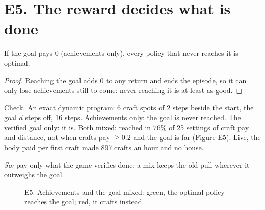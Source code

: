 \section*{E5. The reward decides what is done}
\begin{proposition} If the goal pays $0$ (achievements only), every policy that never reaches it is optimal.\end{proposition}
\begin{proof} Reaching the goal adds $0$ to any return and ends the episode, so it can only lose achievements still to
come: never reaching it is at least as good.\end{proof}
\noindent Check. An exact dynamic program: 6 craft spots of 2 steps beside the start, the goal $d$ steps off, 16 steps.
Achievements only: the goal is never reached. The verified goal only: it is. Both mixed: reached in $76\%$ of 25
settings of craft pay and distance, not when crafts pay $\ge0.2$ and the goal is far (Figure E5). Live, the body paid
per first craft made 897 crafts an hour and no house.

\emph{So:} pay only what the game verifies done; a mix keeps the old pull wherever it outweighs the goal.

\begin{figure}[h]\centering
{}
\caption{E5. Achievements and the goal mixed: green, the optimal policy reaches the goal; red, it crafts instead.}
\end{figure}
